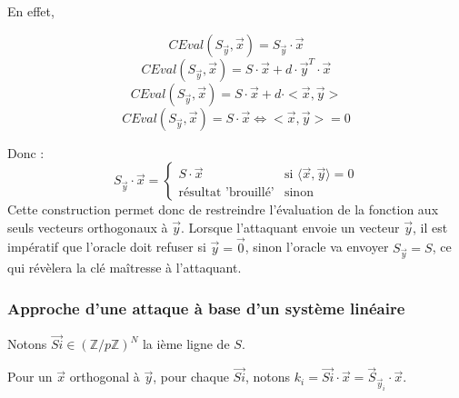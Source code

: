 \documentclass[9pt]{extarticle}
\begin{document}
En effet,

\[CEval(S_{\vec{y}}, \vec{x}) =  S_{\vec{y}} \cdot \vec{x}\]
\[CEval(S_{\vec{y}}, \vec{x}) =  S \cdot \vec{x} + d \cdot \vec{y}^T \cdot \vec{x}\]
\[CEval(S_{\vec{y}}, \vec{x}) =  S \cdot \vec{x} + d \cdot <\vec{x},\vec{y}>\]
\[CEval(S_{\vec{y}}, \vec{x}) =  S \cdot \vec{x} \iff <\vec{x},\vec{y}> = 0\]

Donc :
\[
S_{\vec{y}} \cdot \vec{x} =
\begin{cases}
S \cdot \vec{x} & \text{si } \langle \vec{x}, \vec{y} \rangle = 0 \\
\text{résultat 'brouillé'} & \text{sinon}
\end{cases}
\]
Cette construction permet donc de restreindre l’évaluation de la fonction aux seuls vecteurs orthogonaux à $\vec{y}$. Lorsque l'attaquant envoie un vecteur $\vec{y}$, il est impératif que l'oracle doit refuser si $\vec{y} = \vec{0}$, sinon l'oracle va envoyer $S_{\vec{y}} = S$, ce qui révèlera la clé maîtresse à l'attaquant.

\subsubsection{Approche d'une attaque à base d'un système linéaire}

Notons $\vec{Si} \in (\mathbb{Z}/p\mathbb{Z})^N$ la ième ligne de $S$.

Pour un $\vec{x}$ orthogonal à $\vec{y}$, pour chaque $\vec{Si}$, notons $k_i = \vec{Si} \cdot \vec{x} = \vec{S}_{\vec{y}_i} \cdot \vec{x}$.
\end{document}
